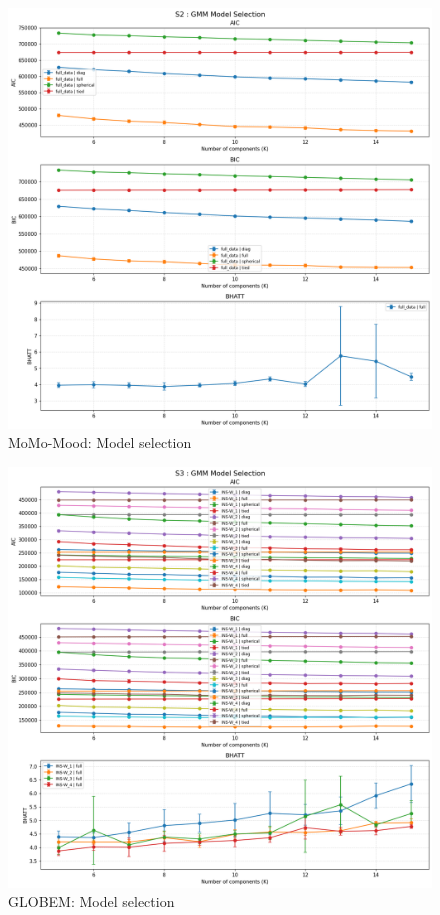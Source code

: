 \begin{appendices}
\begin{figure}[p]
  \centering
  \includegraphics[width=\linewidth]{figures/appendix/momo_gmm_model_selection.png}
  \caption{MoMo-Mood: Model selection}
  \label{fig:momo_gmm_model_selection}
\end{figure}

\begin{figure}[p]
  \centering
  \includegraphics[width=\linewidth]{figures/appendix/globem_gmm_model_selection.png}
  \caption{GLOBEM: Model selection}
  \label{fig:globem_gmm_model_selection}
\end{figure}


\end{appendices}
